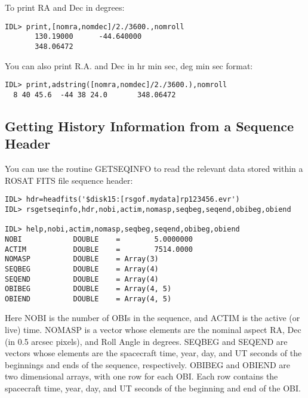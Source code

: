 To print RA and Dec in degrees:

\medskip\noindent
\begin{verbatim}
IDL> print,[nomra,nomdec]/2./3600.,nomroll
       130.19000      -44.640000
       348.06472
\end{verbatim}
You can also print R.A. and Dec in hr min sec, deg min sec format:

\medskip\noindent
\begin{verbatim}
IDL> print,adstring([nomra,nomdec]/2./3600.),nomroll
  8 40 45.6  -44 38 24.0       348.06472
\end{verbatim}
 

\subsection{Getting History Information from a Sequence Header}
 
You can use the routine GETSEQINFO to read the relevant data stored within a
ROSAT FITS file sequence header:

\medskip\noindent
\begin{verbatim}
IDL> hdr=headfits('$disk15:[rsgof.mydata]rp123456.evr')
IDL> rsgetseqinfo,hdr,nobi,actim,nomasp,seqbeg,seqend,obibeg,obiend
 
IDL> help,nobi,actim,nomasp,seqbeg,seqend,obibeg,obiend
NOBI            DOUBLE    =        5.0000000
ACTIM           DOUBLE    =        7514.0000
NOMASP          DOUBLE    = Array(3)
SEQBEG          DOUBLE    = Array(4)
SEQEND          DOUBLE    = Array(4)
OBIBEG          DOUBLE    = Array(4, 5)
OBIEND          DOUBLE    = Array(4, 5)
\end{verbatim}
Here NOBI is the number of OBIs in the sequence, and ACTIM is the active (or
live) time. NOMASP is a vector whose elements are the nominal aspect RA, Dec
(in 0.5 arcsec pixels), and Roll Angle in degrees. SEQBEG and SEQEND are
vectors whose elements are the spacecraft time, year, day, and UT seconds of
the beginnings and ends of the sequence, respectively. OBIBEG and OBIEND are
two dimensional arrays, with one row for each OBI. Each row contains the
spacecraft time, year, day, and UT seconds of the beginning and end of the OBI.

